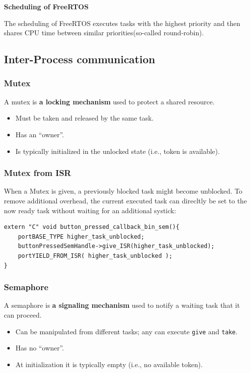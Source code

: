 \textbf{Scheduling of FreeRTOS}

The scheduling of FreeRTOS executes tasks with the highest priority and then shares CPU time between similar priorities(so-called round-robin).

\subsection{Inter-Process communication}

\subsubsection{Mutex}
    A mutex is \textbf{a locking mechanism} used to protect a shared resource.
    \begin{itemize}
        \item Must be taken and released by the same task.
        \item Has an ``owner''.
        \item Is typically initialized in the unlocked state (i.e., token is available).
    \end{itemize}

\subsubsection{Mutex from ISR}

When a Mutex is given, a previously blocked task might become unblocked.
To remove additional overhead, the current executed task can direcltly be set to the now ready task without waiting for an additional systick:
\begin{lstlisting}
extern "C" void button_pressed_callback_bin_sem(){
	portBASE_TYPE higher_task_unblocked;
	buttonPressedSemHandle->give_ISR(higher_task_unblocked);
	portYIELD_FROM_ISR( higher_task_unblocked );
}
\end{lstlisting}

\subsubsection{Semaphore}
    A semaphore is \textbf{a signaling mechanism} used to notify a waiting task that it can proceed.
    \begin{itemize}
        \item Can be manipulated from different tasks; any can execute \texttt{give} and \texttt{take}.
        \item Has no ``owner''.
        \item At initialization it is typically empty (i.e., no available token).
    \end{itemize}

